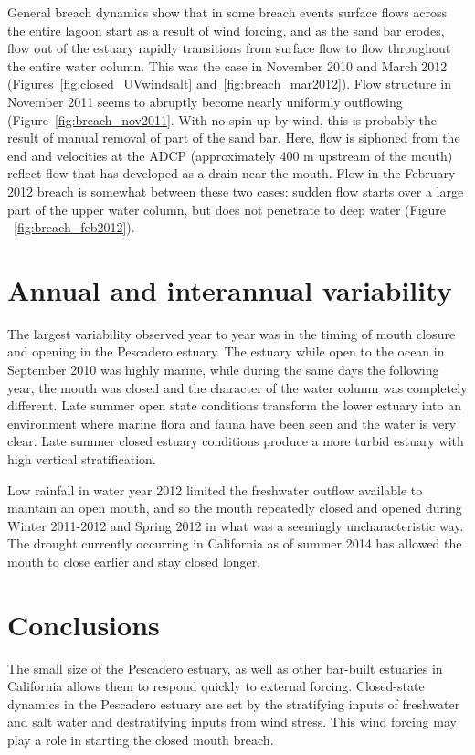 General breach dynamics show that in some breach events surface flows across the entire lagoon start as a result of wind forcing, and as the sand bar erodes, flow out of the estuary rapidly transitions from surface flow to flow throughout the entire water column. This was the case in November 2010 and March 2012 (Figures~\ref{fig:closed_UVwindsalt} and~\ref{fig:breach_mar2012}). Flow structure in November 2011 seems to abruptly become nearly uniformly outflowing (Figure~\ref{fig:breach_nov2011}. With no spin up by wind, this is probably the result of manual removal of part of the sand bar. Here, flow is siphoned from the end and velocities at the ADCP (approximately 400 m upstream of the mouth) reflect flow that has developed as a drain near the mouth. Flow in the February 2012 breach is somewhat between these two cases: sudden flow starts over a large part of the upper water column, but does not penetrate to deep water (Figure ~\ref{fig:breach_feb2012}). 


\section{Annual and interannual variability} \label{sec:annvar}

The largest variability observed year to year was in the timing of mouth closure and opening in the Pescadero estuary. The estuary while open to the ocean in September 2010 was highly marine, while during the same days the following year, the mouth was closed and the character of the water column was completely different. Late summer open state conditions transform the lower estuary into an environment where marine flora and fauna have been seen and the water is very clear. Late summer closed estuary conditions produce a more turbid estuary with high vertical stratification. 

Low rainfall in water year 2012 limited the freshwater outflow available to maintain an open mouth, and so the mouth repeatedly closed and opened during Winter 2011-2012 and Spring 2012 in what was a seemingly uncharacteristic way. The drought currently occurring in California as of summer 2014 has allowed the mouth to close earlier and stay closed longer. 


\section{Conclusions} \label{backofch2}
The small size of the Pescadero estuary, as well as other bar-built estuaries in California allows them to respond quickly to external forcing. Closed-state dynamics in the Pescadero estuary are set by the stratifying inputs of freshwater and salt water and destratifying inputs from wind stress. This wind forcing may play a role in starting the closed mouth breach. 

